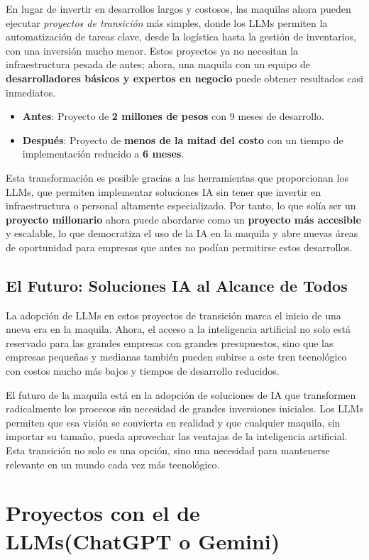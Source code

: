 En lugar de invertir en desarrollos largos y costosos, las maquilas ahora pueden ejecutar \textit{proyectos de transición} más simples, donde los LLMs permiten la automatización de tareas clave, desde la logística hasta la gestión de inventarios, con una inversión mucho menor. Estos proyectos ya no necesitan la infraestructura pesada de antes; ahora, una maquila con un equipo de \textbf{desarrolladores básicos y expertos en negocio} puede obtener resultados casi inmediatos.

\begin{itemize}
    \item \textbf{Antes}: Proyecto de \textbf{2 millones de pesos} con 9 meses de desarrollo.
    \item \textbf{Después}: Proyecto de \textbf{menos de la mitad del costo} con un tiempo de implementación reducido a \textbf{6 meses}.
\end{itemize}

Esta transformación es posible gracias a las herramientas que proporcionan los LLMs, que permiten implementar soluciones IA sin tener que invertir en infraestructura o personal altamente especializado. Por tanto, lo que solía ser un \textbf{proyecto millonario} ahora puede abordarse como un \textbf{proyecto más accesible} y escalable, lo que democratiza el uso de la IA en la maquila y abre nuevas áreas de oportunidad para empresas que antes no podían permitirse estos desarrollos.

\subsection{El Futuro: Soluciones IA al Alcance de Todos}

La adopción de LLMs en estos proyectos de transición marca el inicio de una nueva era en la maquila. Ahora, el acceso a la inteligencia artificial no solo está reservado para las grandes empresas con grandes presupuestos, sino que las empresas pequeñas y medianas también pueden subirse a este tren tecnológico con costos mucho más bajos y tiempos de desarrollo reducidos. 

El futuro de la maquila está en la adopción de soluciones de IA que transformen radicalmente los procesos sin necesidad de grandes inversiones iniciales. Los LLMs permiten que esa visión se convierta en realidad y que cualquier maquila, sin importar su tamaño, pueda aprovechar las ventajas de la inteligencia artificial. Esta transición no solo es una opción, sino una necesidad para mantenerse relevante en un mundo cada vez más tecnológico.

\section{Proyectos con el de LLMs(ChatGPT o Gemini)}

